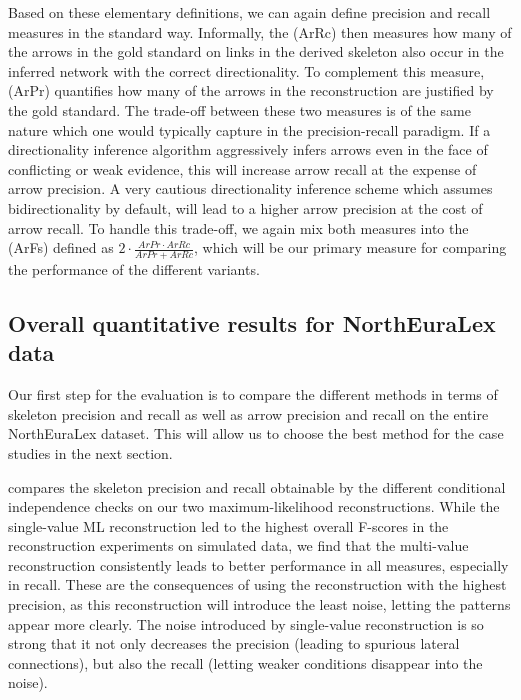 \largerpage
Based on these elementary definitions, we can again define precision and recall measures in the standard way. Informally, the \textit{} (ArRc) then measures how many of the arrows in the gold standard on links in the derived skeleton also occur in the inferred network with the correct directionality. To complement this measure, \textit{} (ArPr) quantifies how many of the arrows in the reconstruction are justified by the gold standard. The trade-off between these two measures is of the same nature which one would typically capture in the precision-recall paradigm. If a directionality inference algorithm aggressively infers arrows even in the face of conflicting or weak evidence, this will increase arrow recall at the expense of arrow precision. A very cautious directionality inference scheme which assumes bidirectionality by default, will lead to a higher arrow precision at the cost of arrow recall. To handle this trade-off, we again mix both measures into the \textit{} (ArFs) defined as $2 \cdot \frac{ArPr \cdot ArRc}{ArPr+ArRc}$, which will be our primary measure for comparing the performance of the different variants.

\subsection{Overall quantitative results for NorthEuraLex data}
Our first step for the evaluation is to compare the different methods in terms of skeleton precision and recall as well as arrow precision and recall on the entire NorthEuraLex dataset. This will allow us to choose the best method for the case studies in the next section.

 compares the skeleton precision and recall obtainable by the different conditional independence checks on our two maximum-likelihood reconstructions. While the single-value ML reconstruction led to the highest overall F-scores in the reconstruction experiments on simulated data, we find that the multi-value reconstruction consistently leads to better performance in all measures, especially in recall. These are the consequences of using the reconstruction with the highest precision, as this reconstruction will introduce the least noise, letting the patterns appear more clearly. The noise introduced by single-value reconstruction is so strong that it not only decreases the precision (leading to spurious lateral connections), but also the recall (letting weaker conditions disappear into the noise).

